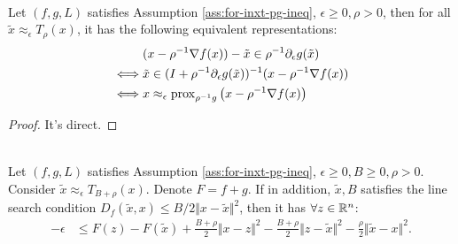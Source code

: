 \documentclass[12pt]{article}
\begin{document}
        \begin{lemma}\;\label{lemma:other-repr-inxt-pg}\\
            Let $(f, g, L)$ satisfies Assumption \ref{ass:for-inxt-pg-ineq}, $\epsilon \ge 0, \rho > 0$, then for all $\tilde x \approx_\epsilon T_\rho(x)$, it has the following equivalent representations: 
            \begin{align*}
                & (x - \rho^{-1}\nabla f(x)) - \tilde x 
                \in \rho^{-1} \partial_\epsilon g(\tilde x)
                \\
                \iff 
                & \tilde x \in (I + \rho^{-1}\partial_\epsilon g(\tilde x))^{-1}
                (x - \rho^{-1}\nabla f(x))
                \\
                \iff 
                & x \approx_\epsilon \operatorname{prox}_{\rho^{-1} g}
                \left(x - \rho^{-1}\nabla f(x)\right)
            \end{align*}
        \end{lemma}
        \begin{proof}
            It's direct. 
        \end{proof}
        \begin{theorem}\;\label{thm:inxt-pg-ineq}\\
            Let $(f, g, L)$ satisfies Assumption \ref{ass:for-inxt-pg-ineq}, $\epsilon \ge 0, B \ge 0, \rho > 0$. 
            Consider $\tilde x \approx_\epsilon T_{B + \rho}(x)$. 
            Denote $F = f + g$. 
            If in addition, $\tilde x, B$ satisfies the line search condition $D_f(\tilde x, x) \le B/2\Vert x - \tilde x\Vert^2$, then it has $\forall z \in \mathbb R^n$: 
            \begin{align*}
                - \epsilon &\le 
                F(z) - F(\tilde x)
                + \frac{B + \rho}{2}\Vert x - z\Vert^2
                - \frac{B + \rho}{2}\Vert z - \tilde x\Vert^2
                - \frac{\rho}{2}\Vert \tilde x - x\Vert^2. 
            \end{align*}
        \end{theorem}
\end{document}

